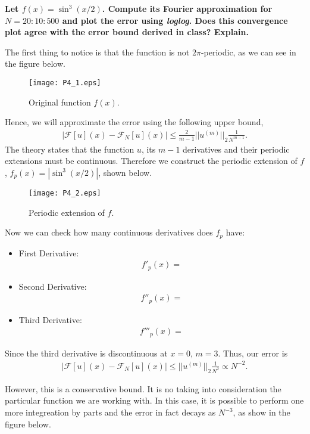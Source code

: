 \textbf{Let $f(x)=\sin^3(x/2)$. Compute its Fourier approximation for $N = 20 : 10 : 500$ and plot the error using \textsl{loglog}. Does this convergence plot agree with the error bound derived in class? Explain.}
\newline

The first thing to notice is that the function is not $2\pi$-periodic, as we can see in the figure below.

\begin{figure}[H]
\centering     %
{\texttt{[image: P4\_1.eps]}}
\caption{Original function $f(x)$.}
\end{figure}

Hence, we will approximate the error using the following upper bound,
\begin{align*}
\left|\mathcal{F}[u](x)-\mathcal{F}_N[u](x)\right|\leq \frac{2}{m-1}||u^{(m)}||_2\frac{1}{N^{m-1}}.
\end{align*}
The theory states that the function $u$, its $m-1$ derivatives and their periodic extensions must be continuous. Therefore we construct the periodic extension of $f$, $f_p(x) = |\sin^3(x/2)|$, shown below.

\begin{figure}[H]
\centering     %
{\texttt{[image: P4\_2.eps]}}
\caption{Periodic extension of $f$.}
\end{figure}

Now we can check how many continuous derivatives does $f_p$ have:
\begin{itemize}
\item First Derivative:
\begin{align*}
f'_p(x)=
\end{align*}
\item Second Derivative:
\begin{align*}
f''_p(x)=
\end{align*}
\item Third Derivative:
\begin{align*}
f'''_p(x)=
\end{align*}
\end{itemize}
Since the third derivative is discontinuous at $x=0$, $m=3$. Thus, our error is
\begin{align*}
\left|\mathcal{F}[u](x)-\mathcal{F}_N[u](x)\right|\leq ||u^{(m)}||_2\frac{1}{N^2}\propto N^{-2}.
\end{align*}

However, this is a conservative bound. It is no taking into consideration the particular function we are working with. In this case, it is possible to perform one more integreation by parts and the error in fact decays as $N^{-3}$, as show in the figure below.

